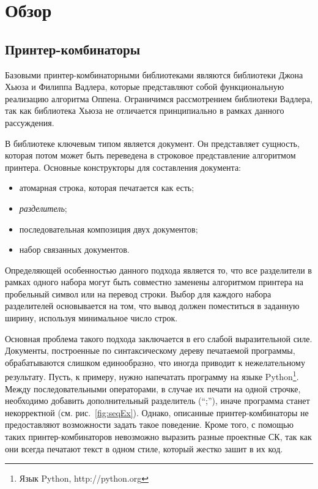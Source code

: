 \section{Обзор}

\subsection{Принтер-комбинаторы}

Базовыми принтер-комбинаторными библиотеками являются библиотеки
Джона Хьюза\cite{hughes} и Филиппа Вадлера\cite{wadler}, которые
представляют собой функциональную реализацию алгоритма
Оппена\cite{oppen}.
Ограничимся рассмотрением библиотеки Вадлера, так как
библиотека Хьюза не отличается принципиально
в рамках данного рассуждения.

В библиотеке ключевым типом является документ.
Он представляет сущность, которая потом может
быть переведена в строковое представление алгоритмом принтера.
Основные конструкторы для составления документа:
\begin{itemize}
  \item атомарная строка, которая печатается как есть;
  \item \emph{разделитель};
  \item последовательная композиция двух документов;
  \item набор связанных документов.
\end{itemize}

Определяющей особенностью данного подхода является то, что все разделители
в рамках одного набора могут быть совместно заменены алгоритмом принтера
на пробельный символ или на перевод строки. Выбор для каждого набора разделителей
основывается на том, что вывод должен поместиться в заданную ширину,
используя минимальное число строк.

Основная проблема такого подхода заключается в его слабой выразительной силе.
Документы, построенные по синтаксическому дереву печатаемой программы,
обрабатываются слишком единообразно, что иногда приводит к нежелательному результату.
Пусть, к примеру, нужно напечатать программу на языке Python\footnote{Язык Python,
http://python.org}.
Между последовательными операторами, в случае их печати на одной строчке, необходимо
добавить дополнительный разделитель (``;''), иначе программа станет некорректной
(см. рис.~\ref{fig:seqEx}). Однако, описанные принтер-комбинаторы не предоставляют
возможности задать такое поведение.
Кроме того, с помощью таких принтер-комбинаторов невозможно выразить разные проектные СК,
так как они всегда печатают текст в одном стиле, который жестко зашит в их код.

